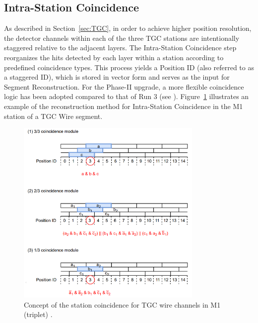 \subsection{Intra-Station Coincidence} \label{subsec:IntraCoin}
As described in Section~\ref{sec:TGC}, in order to achieve higher position resolution, the detector channels within each of the three TGC stations are intentionally staggered relative to the adjacent layers. The Intra-Station Coincidence step reorganizes the hits detected by each layer within a station according to predefined coincidence types. This process yields a Position ID (also referred to as a staggered ID), which is stored in vector form and serves as the input for Segment Reconstruction. For the Phase-II upgrade, a more flexible coincidence logic has been adopted compared to that of Run 3 (see \cite{yamashita}). Figure~\ref{fig:IntraCoin} illustrates an example of the reconstruction method for Intra-Station Coincidence in the M1 station of a TGC Wire segment.

\begin{figure}[htbp]
  \centering
  \includegraphics[width=0.8\textwidth]{figs/chapter5/Intra_station_coincidence.png}
  \caption{Concept of the station coincidence for TGC wire channels in M1 (triplet) \cite{EndcapSLPDR}.}
  \label{fig:IntraCoin}
\end{figure}

